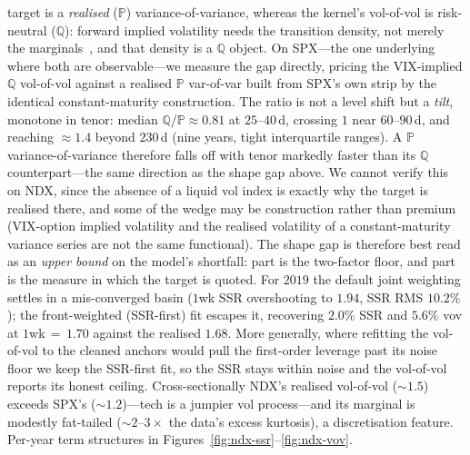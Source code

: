 \documentclass[11pt]{article}
\begin{document}
target is a \emph{realised} ($\mathbb P$) variance-of-variance, whereas the kernel's vol-of-vol is
risk-neutral ($\mathbb Q$): forward implied volatility needs the transition density, not merely the
marginals~\cite{glasserman2010forward}, and that density is a $\mathbb Q$ object. On SPX---the one
underlying where both are observable---we measure the gap directly, pricing the VIX-implied $\mathbb Q$
vol-of-vol against a realised $\mathbb P$ var-of-var built from SPX's own strip by the identical
constant-maturity construction. The ratio is not a level shift but a \emph{tilt}, monotone in tenor: median
$\mathbb Q/\mathbb P\approx0.81$ at $25$--$40$\,d, crossing $1$ near $60$--$90$\,d, and reaching
${\approx}1.4$ beyond $230$\,d (nine years, tight interquartile ranges). A $\mathbb P$ variance-of-variance
therefore falls off with tenor markedly faster than its $\mathbb Q$ counterpart---the same direction as the
shape gap above. We cannot verify this on NDX, since the absence of a liquid vol index is exactly why the
target is realised there, and some of the wedge may be construction rather than premium (VIX-option implied
volatility and the realised volatility of a constant-maturity variance series are not the same functional).
The shape gap is therefore best read as an \emph{upper bound} on the model's shortfall: part is the
two-factor floor, and part is the measure in which the target is quoted.
For $2019$ the default joint weighting settles in a mis-converged basin
($1$wk SSR overshooting to $1.94$, SSR RMS $10.2\%$); the front-weighted (SSR-first) fit escapes it, recovering
$2.0\%$ SSR and $5.6\%$ vov at $1$wk\,${=}\,1.70$ against the realised $1.68$. More generally, where refitting
the vol-of-vol to the cleaned anchors would pull the first-order leverage past its noise floor we keep the
SSR-first fit, so the SSR stays within noise and the vol-of-vol reports its honest ceiling.
Cross-sectionally NDX's realised vol-of-vol (${\sim}1.5$) exceeds SPX's (${\sim}1.2$)---tech is a jumpier vol
process---and its marginal is modestly fat-tailed (${\sim}2$--$3\times$ the data's excess kurtosis), a
discretisation feature. Per-year term structures in Figures~\ref{fig:ndx-ssr}--\ref{fig:ndx-vov}.
\end{document}
